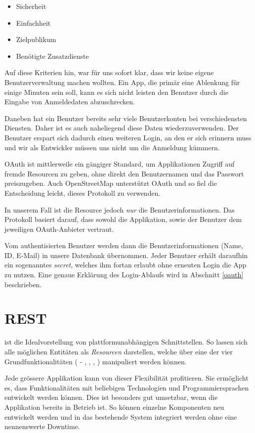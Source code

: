\begin{itemize}
\item Sicherheit
\item Einfachheit
\item Zielpublikum
\item Benötigte Zusatzdienste
\end{itemize}

Auf diese Kriterien hin, war für uns sofort klar, dass wir keine eigene Benutzerverwaltung machen wollten.
Ein App, die primär eine Ablenkung für einige Minuten sein soll, kann es sich nicht leisten den Benutzer durch die Eingabe von Anmeldedaten abzuschrecken.

Daneben hat ein Benutzer bereits sehr viele Benutzerkonten bei verschiedensten Diensten.
Daher ist es auch naheliegend diese Daten wiederzuverwenden.
Der Benutzer erspart sich dadurch einen weiteren Login, an den er sich erinnern muss und wir als Entwickler müssen uns nicht um die Anmeldung kümmern.

\Gls{OAuth} ist mittlerweile ein gängiger Standard, um Applikationen Zugriff auf fremde Resourcen zu geben, ohne direkt den Benutzernamen und das Passwort preiszugeben.
Auch \gls{OpenStreetMap} unterstützt \gls{OAuth} und so fiel die Entscheidung leicht, dieses Protokoll zu verwenden.

In unserem Fall ist die Resource jedoch \emph{nur} die Benutzerinformationen.
Das Protokoll basiert darauf, dass sowohl die Applikation, sowie der Benutzer dem jeweiligen \gls{OAuth}-Anbieter vertraut.

Vom authentisierten Benutzer werden dann die Benutzerinformationen (Name, ID, E-Mail) in unsere Datenbank übernommen.
Jeder Benutzer erhält daraufhin ein sogenanntes \emph{secret}, welches ihm fortan erlaubt ohne erneuten Login die App zu nutzen.
Eine genaue Erklärung des Login-Ablaufs wird in Abschnitt \ref{oauth} beschrieben.

\section{REST}
 ist die Idealvorstellung von plattformunabhängigen Schnittstellen.
So lassen sich alle möglichen Entitäten als \emph{Resourcen} darstellen, welche über eine der vier Grundfunktionalitäten ( - , , , ) manipuliert werden können.

Jede grössere Applikation kann von dieser Flexibilität profitieren.
Sie ermöglicht es, dass Funktionalitäten mit beliebigen Technologien und Programmiersprachen entwickelt werden können.
Dies ist besonders gut umsetzbar, wenn die Applikation bereits in Betrieb ist.
So können einzelne Komponenten neu entwickelt werden und in das bestehende System integriert werden ohne eine nennenswerte Downtime.


